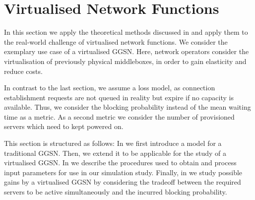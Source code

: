 \section{Virtualised Network Functions}\label{sec:cloud:virtualized_network_functions}
\newcommand{\blockingprobability}[0]{p_B}
\newcommand{\maxServers}[0]{S_{\max}}
In this section we apply the theoretical methods discussed in  and apply them to the real-world challenge of virtualised network functions.
We consider the exemplary use case of a virtualised \gls{GGSN}.
Here, network operators consider the virtualisation of previously physical middleboxes, in order to gain elasticity and reduce costs.

In contrast to the last section, we assume a loss model, as connection establishment requests are not queued in reality but expire if no capacity is available.
Thus, we consider the blocking probability instead of the mean waiting time as a metric.
As a second metric we consider the number of provisioned servers which need to kept powered on. 

This section is structured as follows:
In  we first introduce a model for a traditional \gls{GGSN}.
Then, we extend it to be applicable for the study of a virtualised \gls{GGSN}.
In  we describe the procedures used to obtain and process input parameters for use in our simulation study.
Finally, in  we study possible gains by a virtualised \gls{GGSN} by considering the tradeoff between the required servers to be active simultaneously and the incurred blocking probability. 



